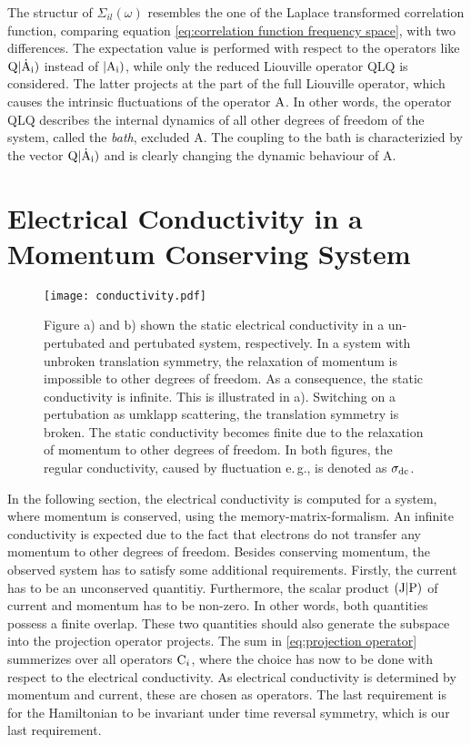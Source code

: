 The structur of $\Sigma_{il}(\omega)$ resembles the one of the Laplace transformed correlation function, comparing equation \eqref{eq:correlation function frequency space}, with two differences.
The expectation value is performed with respect to the operators like $\mathrm{Q}|\mathrm{\dot{\mathrm{A}}_{i}})$ instead of $|\mathrm{\mathrm{A}_{i}})$, while only the reduced Liouville operator QLQ is considered.
The latter projects at the part of the full Liouville operator, which causes the intrinsic fluctuations of the operator $\mathrm{A}$.
In other words, the operator QLQ describes the internal dynamics of all other degrees of freedom of the system, called the \emph{bath}, excluded A.
The coupling to the bath is characterizied by the vector $\mathrm{Q}|\mathrm{\dot{\mathrm{A}}_{i}})$ and is clearly changing the dynamic behaviour of A.
%
%
\section{Electrical Conductivity in a Momentum Conserving System}
\label{sec:conductivity conserved momentum}
%
%
%
\begin{figure}[t]
	\centering
	\texttt{[image: conductivity.pdf]}
	\caption{
Figure a) and b) shown the static electrical conductivity in a un-pertubated and pertubated system, respectively.
In a system with unbroken translation symmetry, the relaxation of momentum is impossible to other degrees of freedom. 
As a consequence, the static conductivity is infinite. This is illustrated in a).
Switching on a pertubation as umklapp scattering, the translation symmetry is broken.
The static conductivity becomes finite due to the relaxation of momentum to other degrees of freedom.
In both figures, the regular conductivity, caused by fluctuation e.\,g., is denoted as $\sigma_{\mathrm{dc}}$.
	}
	\label{fig:conductivity broken and unbroken translation symmetry}
\end{figure}
%
In the following section, the electrical conductivity is computed for a system, where momentum is conserved, using the memory-matrix-formalism.
An infinite conductivity is expected due to the fact that electrons do not transfer any momentum to other degrees of freedom.
Besides conserving momentum, the observed system has to satisfy some additional requirements.
Firstly, the current has to be an unconserved quantitiy.
Furthermore, the scalar product $({\mathrm{J}}|{\mathrm{P}})$ of current and momentum has to be non-zero.
In other words, both quantities possess a finite overlap.
These two quantities should also generate the subspace into the projection operator projects.
The sum in \eqref{eq:projection operator} summerizes over all operators $\mathrm{C}_{i}$, where the choice has now to be done with respect to the electrical conductivity.
As electrical conductivity is determined by momentum and current, these are chosen as operators.
The last requirement is for the Hamiltonian to be invariant under time reversal symmetry, which is our last requirement.

